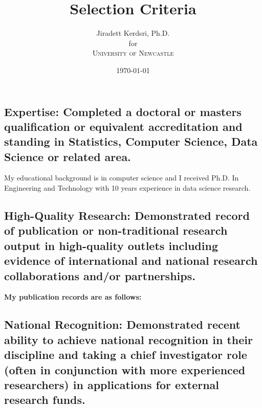 \documentclass[12pt]{article}
\title{Selection Criteria } %
\author{Jiradett Kerdsri, Ph.D.\\ %
for\\ %
\textsc{University of Newcastle}
}
\date{\today} %
\begin{document}
\setlength{\droptitle}{-5em}    
\maketitle



\subsection*{Expertise: Completed a doctoral or masters qualification or equivalent accreditation and standing in
Statistics, Computer Science, Data Science or related area.}
{\bfseries }

My educational background is in computer science and I received Ph.D. In Engineering and Technology with 10 years experience in data science research.

\subsection*{High-Quality Research: Demonstrated record of publication or non-traditional research output in high-quality outlets including evidence of international and national research collaborations and/or partnerships.}
{\bfseries My publication records are as follows:}

\begin{refsection}
    \nocite{Kerdsri2017}
    \nocite{doi:10.1155/2015/819178}
    \nocite{Kerdsri2013}
    \nocite{journal2013}
    \nocite{waset2011}
    \AtNextBibliography{\small}
    \printbibliography[title={Journals}]
  \end{refsection}

  \begin{refsection}
    \nocite{Kerdsri2018}
    \nocite{7886152}
    \nocite{7332543}
    \nocite{Kerdsri2012}
    \nocite{6427357}
    \nocite{6174610}
    \nocite{waset2010}
    \AtNextBibliography{\small}
    \printbibliography[title={Conference Proceedings}]
  \end{refsection}
  
  \begin{refsection}
    \nocite{book2007}
    \nocite{kerdsri2003snmp}
    \AtNextBibliography{\small}
    \printbibliography[title={Books}]
  \end{refsection}

\subsection*{National Recognition: Demonstrated recent ability to achieve national recognition in their discipline and taking a chief investigator role (often in conjunction with more experienced researchers) in applications for external research funds.}
\end{document}
